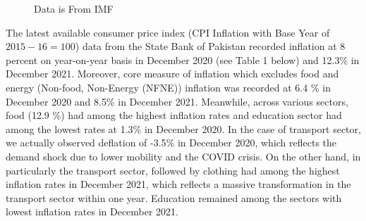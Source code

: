 \documentclass[12pt]{article}
\newcommand{\1}{\mathbbm 1}
\begin{document}
		
		
		
		
		
		
		
		
		\begin{figure}[H]
			\centering
			\scalebox{0.6}{}
			\hfill
			\caption{Data is From IMF}
		\end{figure}
		
		
		
		The latest available consumer price index (CPI Inflation with Base Year of $2015-16 =100$) data from the State Bank of Pakistan recorded inflation at 8 percent on year-on-year basis in December 2020 (see Table 1 below) and 12.3\% in December 2021. Moreover, core measure of inflation which excludes food and energy (Non-food, Non-Energy (NFNE)) inflation was recorded at 6.4 $\%$ in December 2020 and 8.5$\%$ in December 2021. Meanwhile, across various sectors, food (12.9 $\%$) had among the highest inflation rates and education sector had among the lowest rates at 1.3$\%$ in December 2020. In the case of transport sector, we actually observed deflation of -3.5$\%$ in December 2020, which reflects the demand shock due to lower mobility and the COVID crisis. On the other hand, in particularly the transport sector, followed by clothing had among the highest inflation rates in December 2021, which reflects a massive transformation in the transport sector within one year. Education remained among the sectors with lowest inflation rates in December 2021.
		
		
		
	
		
\end{document}
